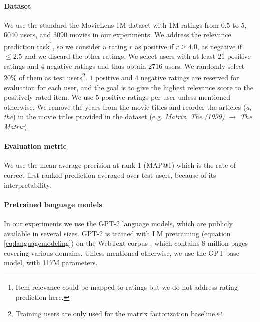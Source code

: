 \documentclass[runningheads]{llncs}
\begin{document}
\paragraph{\textbf{Dataset}} We use the standard the MovieLens 1M dataset \cite{harper15} with 1M ratings from $0.5$ to $5$, 6040 users, and 3090 movies in our experiments. We address the relevance prediction task\footnote{Item relevance could be mapped to ratings but we do not address rating prediction here.}, so we consider a rating $r$ as positive if $r \geq 4.0$, as negative if  $\leq 2.5$ and we discard the other ratings. We select users with at least $21$ positive ratings and $4$ negative ratings and thus obtain $2716$ users. We  randomly select $20\%$ of them as test users\footnote{Training users are only used for the matrix factorization baseline.}. $1$ positive and $4$ negative ratings are reserved for evaluation for each user, and the goal is to give the highest relevance score to the positively rated item. We use $5$ positive ratings per user unless mentioned otherwise. We remove the years from the movie titles and reorder the articles (\textit{a, the}) in the movie titles provided in the dataset (e.g. \textit{Matrix, The (1999)} $\rightarrow$ \textit{The Matrix}).
 \vspace{-0.25cm}

 \paragraph{\textbf{Evaluation metric}} We use the mean average precision at rank 1 (MAP@1) \cite{schroder2011setting} which is the rate of correct first ranked prediction averaged over test users, because of its interpretability.
 \vspace{-0.25cm}
 
\paragraph{\textbf{Pretrained language models}} In our experiments we use the GPT-2 \cite{radford2019language} language models, which are publicly available in several sizes. GPT-2 is trained with LM pretraining (equation \ref{eq:languagemodeling}) on the WebText corpus \cite{radford2019language}, which contains 8 million pages covering various domains. Unless mentioned otherwise, we use the GPT-base model, with 117M parameters.

 \vspace{-0.1cm}
\end{document}
